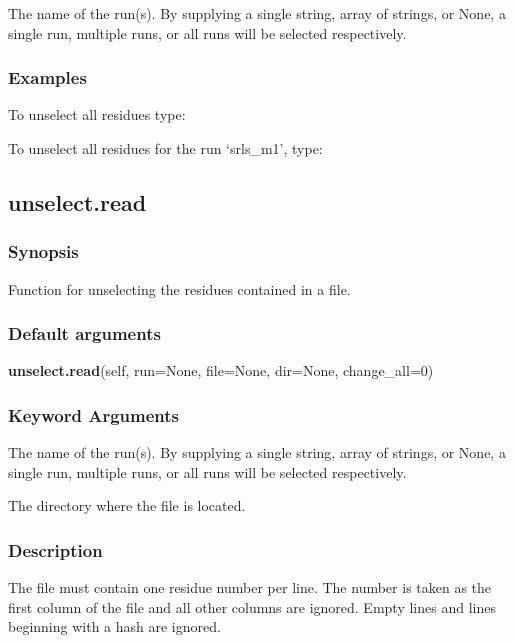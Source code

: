   The name of the run(s).  By supplying a single string, array of strings, or None, a single run, multiple runs, or all runs will be selected respectively.

\subsubsection{Examples}

To unselect all residues type:


To unselect all residues for the run `srls\_m1', type:




\newpage

\subsection{unselect.read}


\subsubsection{Synopsis}

Function for unselecting the residues contained in a file.

\subsubsection{Default arguments}

\textsf{\textbf{unselect.read}(self, run=None, file=None, dir=None, change\_all=0)}


\subsubsection{Keyword Arguments}

  The name of the run(s).  By supplying a single string, array of strings, or None, a single run, multiple runs, or all runs will be selected respectively.

  The directory where the file is located.


\subsubsection{Description}

The file must contain one residue number per line.  The number is taken as the first column
of the file and all other columns are ignored.  Empty lines and lines beginning with a hash
are ignored.

